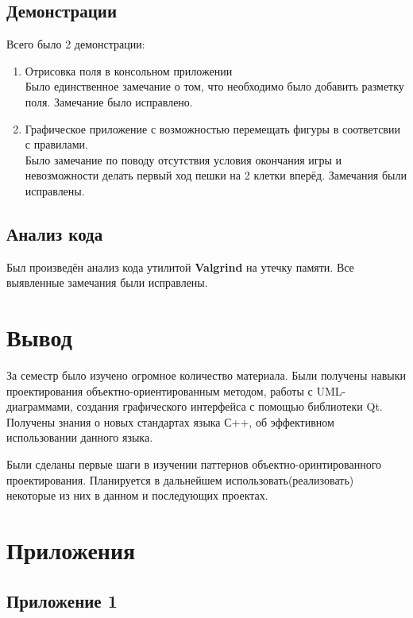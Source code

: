 \subsection*{Демонстрации}
Всего было 2 демонстрации:
\begin{enumerate}
\item Отрисовка поля в консольном приложении\\
Было единственное замечание о том, что необходимо было добавить разметку поля. Замечание было исправлено.\\
\item Графическое приложение с возможностью перемещать фигуры в соответсвии с правилами.\\
Было замечание по поводу отсутствия условия окончания игры и невозможности делать первый ход пешки на 2 клетки вперёд. Замечания были исправлены.\\
\end{enumerate}

\subsection*{Анализ кода}
Был произведён анализ кода утилитой \textbf{Valgrind} на утечку памяти. Все выявленные замечания были исправлены.

\section*{Вывод}
За семестр было изучено огромное количество материала. Были получены навыки проектирования объектно-ориентированным методом, работы с UML-диаграммами, создания графического интерфейса с помощью библиотеки Qt. Получены знания о новых стандартах языка С++, об эффективном использовании данного языка.

Были сделаны первые шаги в изучении паттернов объектно-оринтированного проектирования. Планируется в дальнейшем использовать(реализовать) некоторые из них в данном и последующих проектах.

\section*{Приложения}

\subsection*{Приложение 1}

